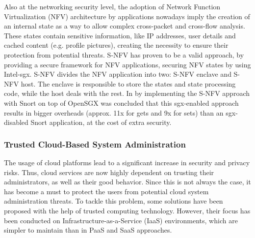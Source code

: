 Also at the networking security level, the adoption of Network Function Virtualization (NFV) architecture by applications nowadays imply the creation of an internal state as a way to allow complex cross-packet and cross-flow analysis. 
These states contain sensitive information, like IP addresses, user details and cached content (e.g. profile pictures), creating the necessity to ensure their protection from potential threats.
S-NFV \cite{sNFVPaper} has proven to be a valid approach, by providing a secure framework for NFV applications, securing NFV states by using Intel-\gls{sgx}.
S-NFV divides the NFV application into two: S-NFV enclave and S-NFV host. The enclave is responsible to store the states and state processing code, while the host deals with the rest.
In \cite{sNFVPaper} by implementing the S-NFV approach with Snort \cite{snortPaper} on top of OpenSGX was
concluded that this \gls{sgx}-enabled approach results in bigger overheads (approx. 11x for
gets and 9x for sets) than an \gls{sgx}-disabled Snort application, at the cost of extra security.\newline

\subsubsection{Trusted Cloud-Based System Administration}

The usage of cloud platforms lead to a significant increase in security and privacy risks. Thus, cloud services are now highly dependent on trusting their administrators, as well as their good behavior. Since this is not always the case, it has become a must to protect the users from potential cloud system administration threats. 
To tackle this problem, some solutions have been proposed with the help of trusted computing technology. However, their focus has been conducted on Infrastructure-as-a-Service (IaaS) environments, which are simpler to maintain than in PaaS and SaaS approaches.

